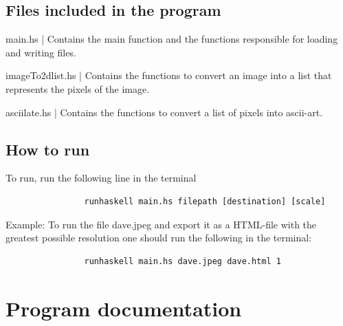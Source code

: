 \documentclass[12pt, a4paper]{article}
\begin{document}
		

	
		\subsection{Files included in the program }
		
		main.hs | Contains the main function and the functions responsible for loading and writing files.

		imageTo2dlist.hs | Contains the functions to convert an image into a list that represents the pixels of the image.

		asciilate.hs | Contains the functions to convert a list of pixels into ascii-art.
			
		\subsection{How to run}

		To run, run the following line in the terminal
		\begin{footnotesize}
			\begin{verbatim}
				runhaskell main.hs filepath [destination] [scale]
			\end{verbatim}
		\end{footnotesize} 
		
		Example: To run the file dave.jpeg and export it as a HTML-file with the greatest possible resolution one should run the following in the terminal:
		
		\begin{footnotesize}
			\begin{verbatim}
				runhaskell main.hs dave.jpeg dave.html 1
			\end{verbatim}
		\end{footnotesize} 

	\section{Program documentation}

		

\end{document}
